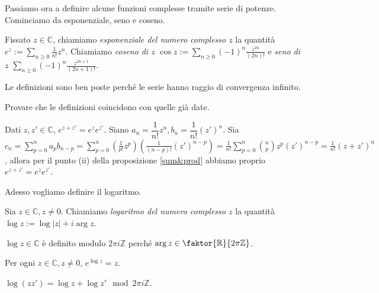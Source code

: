 Passiamo ora a definire alcune funzioni complesse tramite serie di potenze. Cominciamo da esponenziale, seno e coseno.

\begin{defn}
  Fissato $z \in \mathbb{C}$, chiamiamo \textit{esponenziale del numero complesso $z$} la quantità $\displaystyle e^z:=\sum_{n \ge 0} \frac{1}{n!}z^n$.
  Chiamiamo \textit{coseno di $z$} $\displaystyle \cos{z}:=\sum_{n \ge 0}(-1)^n\frac{z^{2n}}{(2n)!}$ e \textit{seno di $z$} $\displaystyle \sum_{n \ge 0}(-1)^n \frac{z^{2n+1}}{(2n+1)!}$.
\end{defn}

\begin{oss}
  Le definizioni sono ben poste perché le serie hanno raggio di convergenza infinito.
\end{oss}

\begin{exc}
  Provare che le definizioni coincidono con quelle già date.
\end{exc}

\begin{ex}
  Dati $z, z' \in \mathbb{C}$, $e^{z+z'}=e^ze^{z'}$. Siano $a_n=\dfrac{1}{n!}z^n, b_n=\dfrac{1}{n!}(z')^n$.
  Sia $\displaystyle c_n=\sum_{p=0}^n a_pb_{n-p}=\sum_{p=0}^n \left(\frac{1}{p!}z^p\right)\left(\frac{1}{(n-p)!}(z')^{n-p}\right)=\frac{1}{n!}\sum_{p=0}^n\binom{n}{p}z^p(z')^{n-p}=\frac{1}{n!}(z+z')^n$,
  allora per il punto (ii) della proposizione \ref{sum&prod} abbiamo proprio $e^{z+z'}=e^ze^{z'}$.
\end{ex}

Adesso vogliamo definire il logaritmo.

\begin{defn}
  Sia $z \in \mathbb{C}, z \not=0$. Chiamiamo \textit{logaritmo del numero complesso $z$} la quantità $\log{z}:=\log{|z|}+i\arg{z}$.
\end{defn}

\begin{oss}
  $\log{z} \in \mathbb{C}$ è definito modulo $2\pi i \mathbb{Z}$ perché $\arg{z} \in \faktor{\mathbb{R}}{2\pi \mathbb{Z}}$.
\end{oss}

\begin{prop}
  Per ogni $z \in \mathbb{C}, z \not=0$, $e^{\log{z}}=z$.
\end{prop}

\begin{ftt}
  $\log{(zz')}=\log{z}+\log{z'} \mod{2\pi i \mathbb{Z}}$.
\end{ftt}

